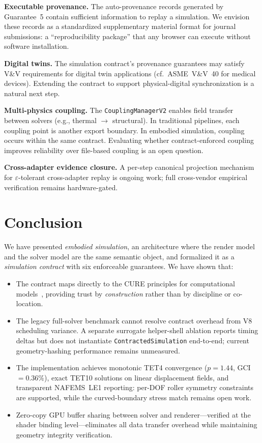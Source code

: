 \documentclass[journal]{IEEEtran}
\begin{document}
\textbf{Executable provenance.} The auto-provenance records generated by
Guarantee~5 contain sufficient information to replay a simulation. We
envision these records as a standardized supplementary material format for
journal submissions: a ``reproducibility package'' that any browser can
execute without software installation.

\textbf{Digital twins.} The simulation contract's provenance guarantees may
satisfy V\&V requirements for digital twin applications (cf.\ ASME~V\&V~40
for medical devices). Extending the contract to support physical-digital
synchronization is a natural next step.

\textbf{Multi-physics coupling.} The \texttt{CouplingManagerV2} enables
field transfer between solvers (e.g., thermal $\to$ structural). In
traditional pipelines, each coupling point is another export boundary. In
embodied simulation, coupling occurs within the same contract. Evaluating
whether contract-enforced coupling improves reliability over file-based
coupling is an open question.

\textbf{Cross-adapter evidence closure.} A per-step canonical projection
mechanism for $\varepsilon$-tolerant cross-adapter replay is ongoing work;
full cross-vendor empirical verification remains hardware-gated.


\section{Conclusion}
\label{sec:conclusion}

We have presented \emph{embodied simulation}, an architecture where the
render model and the solver model are the same semantic object, and
formalized it as a \emph{simulation contract} with six enforceable
guarantees. We have shown that:

\begin{itemize}
  \item The contract maps directly to the CURE principles for computational
    models~\cite{CURE2026}, providing trust by \emph{construction} rather
    than by discipline or co-location.
  \item The legacy full-solver benchmark cannot resolve contract overhead from
    V8 scheduling variance. A separate surrogate helper-shell ablation reports
    timing deltas but does not instantiate \texttt{ContractedSimulation}
    end-to-end; current geometry-hashing performance remains unmeasured.
  \item The implementation achieves monotonic TET4 convergence ($p = 1.44$,
    GCI $= 0.36\%$), exact TET10 solutions on linear displacement fields,
    and transparent NAFEMS~LE1 reporting: per-DOF roller symmetry constraints
    are supported, while the curved-boundary stress match remains open work.
  \item Zero-copy GPU buffer sharing between solver and renderer---verified
    at the shader binding level---eliminates all data transfer overhead
    while maintaining geometry integrity verification.
\end{itemize}
\end{document}
